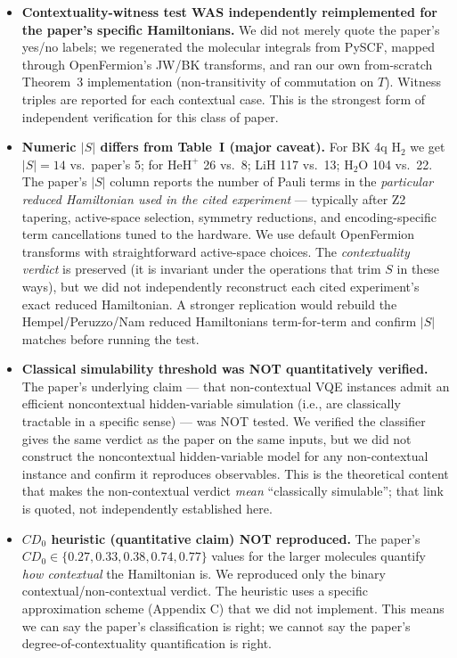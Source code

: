 \documentclass[11pt]{article}
\begin{document}
\begin{itemize}
\item \textbf{Contextuality-witness test WAS independently reimplemented
  for the paper's specific Hamiltonians.} We did not merely quote the paper's
  yes/no labels; we regenerated the molecular integrals from PySCF, mapped
  through OpenFermion's JW/BK transforms, and ran our own from-scratch
  Theorem~3 implementation (non-transitivity of commutation on $T$). Witness
  triples are reported for each contextual case. This is the strongest
  form of independent verification for this class of paper.

\item \textbf{Numeric $|S|$ differs from Table~I (major caveat).} For BK 4q
  $\mathrm{H}_2$ we get $|S|=14$ vs.\ paper's 5; for $\mathrm{HeH}^+$ 26
  vs.\ 8; LiH 117 vs.\ 13; $\mathrm{H}_2\mathrm{O}$ 104 vs.\ 22. The paper's
  $|S|$ column reports the number of Pauli terms in the \emph{particular
  reduced Hamiltonian used in the cited experiment} --- typically after Z2
  tapering, active-space selection, symmetry reductions, and encoding-specific
  term cancellations tuned to the hardware. We use default OpenFermion
  transforms with straightforward active-space choices. The
  \emph{contextuality verdict} is preserved (it is invariant under the
  operations that trim $S$ in these ways), but we did not independently
  reconstruct each cited experiment's exact reduced Hamiltonian. A stronger
  replication would rebuild the Hempel/Peruzzo/Nam reduced Hamiltonians
  term-for-term and confirm $|S|$ matches before running the test.

\item \textbf{Classical simulability threshold was NOT quantitatively
  verified.} The paper's underlying claim --- that non-contextual VQE
  instances admit an efficient noncontextual hidden-variable simulation
  (i.e., are classically tractable in a specific sense) --- was NOT tested.
  We verified the classifier gives the same verdict as the paper on the
  same inputs, but we did not construct the noncontextual hidden-variable
  model for any non-contextual instance and confirm it reproduces observables.
  This is the theoretical content that makes the non-contextual verdict
  \emph{mean} ``classically simulable''; that link is quoted, not
  independently established here.

\item \textbf{$CD_0$ heuristic (quantitative claim) NOT reproduced.} The
  paper's $CD_0 \in \{0.27, 0.33, 0.38, 0.74, 0.77\}$ values for the larger
  molecules quantify \emph{how contextual} the Hamiltonian is. We reproduced
  only the binary contextual/non-contextual verdict. The heuristic uses a
  specific approximation scheme (Appendix C) that we did not implement.
  This means we can say the paper's classification is right; we cannot
  say the paper's degree-of-contextuality quantification is right.


\end{itemize}
\end{document}
